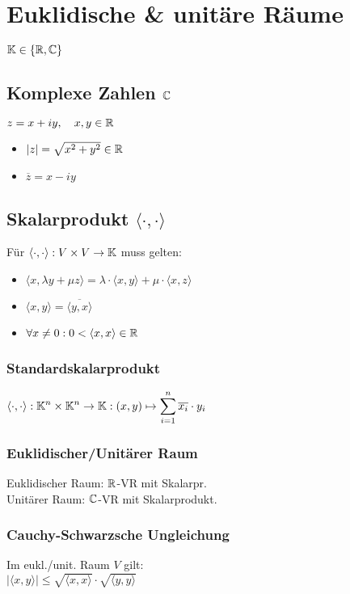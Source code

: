 \section*{Euklidische \& unitäre Räume}
$\mathbb{K}\in\{\mathbb{R},\mathbb{C}\}$

\subsection*{Komplexe Zahlen $\mathbb{C}$}
$z=x+iy,\quad x,y\in\mathbb{R}$
\begin{itemize}
	\item $|z| = \sqrt{x^2 + y^2} \in\mathbb{R}$
	\item $\overline{z} = x - iy$
\end{itemize}

\subsection*{Skalarprodukt $\langle\cdot,\cdot\rangle$}
Für $\langle\cdot,\cdot\rangle: V \times V \to \mathbb{K}$ muss gelten:
\begin{itemize}
	\item $\langle x,\lambda y + \mu z \rangle = \lambda\cdot\langle x,y\rangle + \mu\cdot\langle x,z\rangle$
	\item $\langle x,y \rangle = \overline{\langle y,x \rangle}$
	\item $\forall x\neq 0: 0 < \langle x,x \rangle \in \mathbb{R}$
\end{itemize}

\subsubsection*{Standardskalarprodukt}
$\displaystyle \langle\cdot,\cdot\rangle: \mathbb{K}^n \times \mathbb{K}^n \to \mathbb{K}: (x,y)\mapsto \sum_{i=1}^n \overline{x_i}\cdot y_i$

\subsubsection*{Euklidischer/Unitärer Raum}
Euklidischer Raum: $\mathbb{R}$-VR mit Skalarpr. \\
Unitärer Raum: $\mathbb{C}$-VR mit Skalarprodukt.

\subsubsection*{Cauchy-Schwarzsche Ungleichung}
Im eukl./unit. Raum $V$ gilt: \\
$|\langle x,y\rangle| \le \sqrt{\langle x,x \rangle}\cdot\sqrt{\langle y,y \rangle}$

